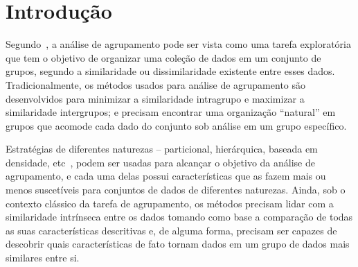 \documentclass[
    12pt,                %
    oneside,            %
    a4paper,            %
    english,            %
    brazil                %
    ]{abntex2ppgsi}
\begin{document}

\chapter{Introdução}
\label{cap:intro}




Segundo~, a análise de agrupamento pode ser vista como uma tarefa exploratória que tem o objetivo de organizar uma coleção de dados em um conjunto de grupos, segundo a similaridade ou dissimilaridade existente entre esses dados.
Tradicionalmente, os métodos usados para análise de agrupamento são desenvolvidos para minimizar a similaridade intragrupo e maximizar a similaridade intergrupos; e precisam encontrar uma organização ``natural'' em grupos que acomode cada dado do conjunto sob análise em um grupo específico.

Estratégias de diferentes naturezas -- particional, hierárquica, baseada em densidade, etc~\cite{Han2011,Xu2005}, podem ser usadas para alcançar o objetivo da análise de agrupamento, e cada uma delas possui características que as fazem mais ou menos suscetíveis para conjuntos de dados de diferentes naturezas.
Ainda, sob o contexto clássico da tarefa de agrupamento, os métodos precisam lidar com a similaridade intrínseca entre os dados tomando como base a comparação de todas as suas características descritivas e, de alguma forma, precisam ser capazes de descobrir quais características de fato tornam dados em um grupo de dados mais similares entre si.
\end{document}

